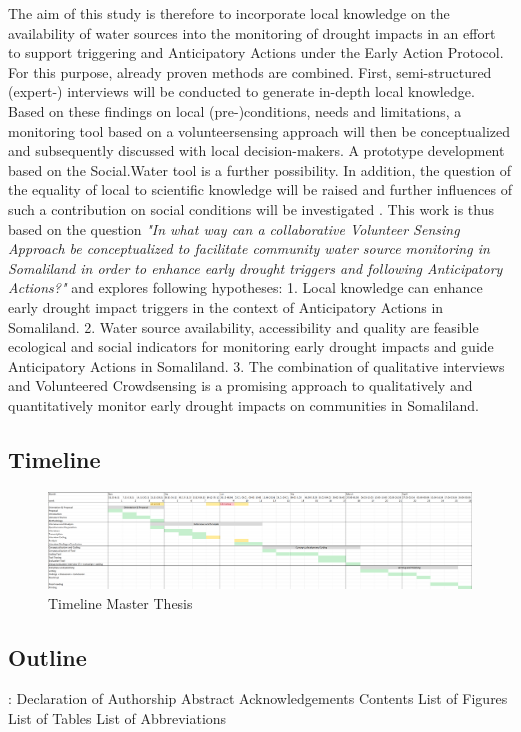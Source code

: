 The aim of this study is therefore to incorporate local knowledge on the availability of water sources into the monitoring of drought impacts in an effort to support triggering and Anticipatory Actions under the Early Action Protocol. For this purpose, already proven methods are combined. First, semi-structured (expert-) interviews will be conducted to generate in-depth local knowledge. Based on these findings on local (pre-)conditions, needs and limitations, a monitoring tool based on a volunteersensing approach will then be conceptualized and subsequently discussed with local decision-makers. A prototype development based on the Social.Water tool is a further possibility. In addition, the question of the equality of local to scientific knowledge will be raised and further influences of such a contribution on social conditions will be investigated .
This work is thus based on the question \textit{"In what way can a collaborative Volunteer Sensing Approach be conceptualized to facilitate community water source monitoring in Somaliland in order to enhance early drought triggers and following Anticipatory Actions?"} and explores following hypotheses:
1. Local knowledge can enhance early drought impact triggers in the context of Anticipatory Actions in Somaliland.
2. Water source availability, accessibility and quality are feasible ecological and social indicators for monitoring early drought impacts and guide Anticipatory Actions in Somaliland.
3. The combination of qualitative interviews and Volunteered Crowdsensing is a promising approach to qualitatively and quantitatively monitor early drought impacts on communities in Somaliland.

\subsection{Timeline}
\begin{figure}[th]
    \centering
    \includegraphics{Figures/SottmannBosse_timeline.png}
    \caption[Timeline Master Thesis]{Timeline Master Thesis}
    \label{fig:timeline}
    \end{figure}
    
\subsection{Outline}:
Declaration of Authorship
Abstract
Acknowledgements
Contents
List of Figures
List of Tables
List of Abbreviations

